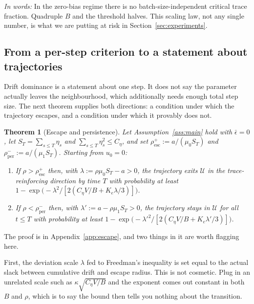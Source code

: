 \documentclass{article}
\theoremstyle{plain}
\newtheorem{theorem}{Theorem}
\theoremstyle{definition}
\theoremstyle{remark}
\newcommand{\1}{\mathbf{1}}
\newcommand{\cU}{\mathcal{U}}
\newcommand{\takeaway}[1]{%
  \par\medskip\noindent\textit{In words:} #1\par\medskip}
\begin{document}
\takeaway{In the zero-bias regime there is no batch-size-independent critical
trace fraction. Quadruple $B$ and the threshold halves. This scaling law, not any
single number, is what we are putting at risk in Section~\ref{sec:experiments}.}

\subsection{From a per-step criterion to a statement about trajectories}
\label{sec:escape}

Drift dominance is a statement about one step. It does not say the parameter
actually leaves the neighbourhood, which additionally needs enough total step
size. The next theorem supplies both directions: a condition under which the
trajectory escapes, and a condition under which it provably does not.

\begin{theorem}[Escape and persistence]
\label{thm:escape}
Let Assumption~\ref{ass:main} hold with $\bar\epsilon = 0$, let
$S_T = \sum_{s\le T}\eta_s$ and $\sum_{s\le T}\eta_s^2\le C_\eta$, and set
$\rho^{+}_{\mathrm{esc}} := a/(\mu_0S_T)$ and
$\rho^{-}_{\mathrm{per}} := a/(\mu_1S_T)$. Starting from $u_0 = 0$:
\begin{enumerate}[leftmargin=*,itemsep=2pt]
\item[(i)] If $\rho > \rho^{+}_{\mathrm{esc}}$ then, with
$\lambda := \rho\mu_0S_T - a > 0$, the trajectory exits $\cU$ in the
trace-reinforcing direction by time $T$ with probability at least
$1 - \exp\big(-\lambda^2/[2(C_\eta V/B + K_e\lambda/3)]\big)$.
\item[(ii)] If $\rho < \rho^{-}_{\mathrm{per}}$ then, with
$\lambda' := a - \rho\mu_1S_T > 0$, the trajectory stays in $\cU$ for all
$t\le T$ with probability at least
$1 - \exp\big(-\lambda'^2/[2(C_\eta V/B + K_e\lambda'/3)]\big)$.
\end{enumerate}
\end{theorem}

The proof is in Appendix~\ref{app:escape}, and two things in it are worth
flagging here.

First, the deviation scale $\lambda$ fed to Freedman's inequality is set equal to
the actual slack between cumulative drift and escape radius. This is not
cosmetic. Plug in an unrelated scale such as $\kappa\sqrt{C_\eta V/B}$ and the
exponent comes out constant in both $B$ and $\rho$, which is to say the bound
then tells you nothing about the transition.
\end{document}
